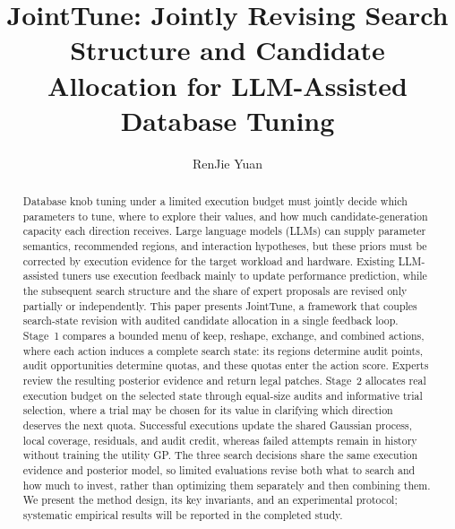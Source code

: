 \documentclass[runningheads]{llncs}
\begin{document}
\title{JointTune: Jointly Revising Search Structure and Candidate
Allocation for LLM-Assisted Database Tuning}


\author{RenJie Yuan}



\maketitle

\begin{abstract}
Database knob tuning under a limited execution budget must jointly
decide which parameters to tune, where to explore their values, and how
much candidate-generation capacity each direction receives. Large
language models (LLMs) can supply parameter semantics, recommended
regions, and interaction hypotheses, but these priors must be corrected
by execution evidence for the target workload and hardware. Existing
LLM-assisted tuners use execution feedback mainly to update performance
prediction, while the subsequent search structure and the share of
expert proposals are revised only partially or independently. This paper
presents JointTune, a framework that couples search-state revision with
audited candidate allocation in a single feedback loop. Stage~1 compares
a bounded menu of keep, reshape, exchange, and combined actions, where
each action induces a complete search state: its regions determine audit
points, audit opportunities determine quotas, and these quotas enter the
action score. Experts review the resulting posterior evidence and return
legal patches. Stage~2 allocates real execution budget on the selected
state through equal-size audits and informative trial selection, where a
trial may be chosen for its value in clarifying which direction deserves
the next quota. Successful executions update the shared Gaussian process,
local coverage, residuals, and audit credit, whereas failed attempts
remain in history without training the utility GP. The three search
decisions share the same execution evidence and posterior model, so
limited evaluations revise both what to search and how much to invest,
rather than optimizing them separately and then combining them. We
present the method design, its key invariants, and an experimental
protocol; systematic empirical results will be reported in the completed
study.
\end{abstract}
\end{document}
